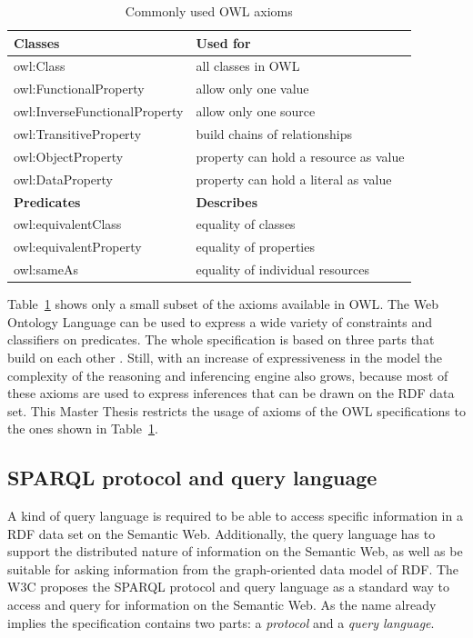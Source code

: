 \begin{table}[H]
\centering
\begin{tabular}{p{5cm}p{7cm}}
\hline
\textbf{Classes} & \textbf{Used for} \\
\hline
owl:Class & all classes in \gls{OWL}  \\
\hline
owl:FunctionalProperty & allow only one value \\
\hline
owl:InverseFunctionalProperty & allow only one source \\
\hline
owl:TransitiveProperty & build chains of relationships \\
\hline
owl:ObjectProperty & property can hold a resource as value \\
\hline
owl:DataProperty & property can hold a literal as value \\
\hline
\textbf{Predicates} & \textbf{Describes} \\
\hline
owl:equivalentClass &	equality of classes \\
\hline
owl:equivalentProperty & equality of properties \\
\hline
owl:sameAs & equality of individual resources \\
\hline
\end{tabular}
\caption[Commonly used \gls{OWL} axioms]{Commonly used \gls{OWL} axioms \citep[pg. 153-185]{allemang2011semantic}}
\label{tab:w3c_vocab_owl}
\end{table}

Table~\ref{tab:w3c_vocab_owl} shows only a small subset of the axioms available in \gls{OWL}. The Web Ontology Language can be used to express a wide variety of constraints and classifiers on predicates. The whole specification is based on three parts that build on each other \citep{owlspec}. Still, with an increase of expressiveness in the model the complexity of the reasoning and inferencing engine also grows, because most of these axioms are used to express inferences that can be drawn on the \gls{RDF} data set. This Master Thesis restricts the usage of axioms of the \gls{OWL} specifications to the ones shown in Table~\ref{tab:w3c_vocab_owl}.


\subsection{\gls{SPARQL} protocol and query language}
\label{sec:semantic_querylang}

A kind of query language is required to be able to access specific information in a \gls{RDF} data set on the Semantic Web. Additionally, the query language has to support the distributed nature of information on the Semantic Web, as well as be suitable for asking information from the graph-oriented data model of \gls{RDF}. The \gls{W3C} proposes the \gls{SPARQL} protocol and query language as a standard way to access and query for information on the Semantic Web. As the name already implies the specification contains two parts: a \emph{protocol} and a \emph{query language}. \\

